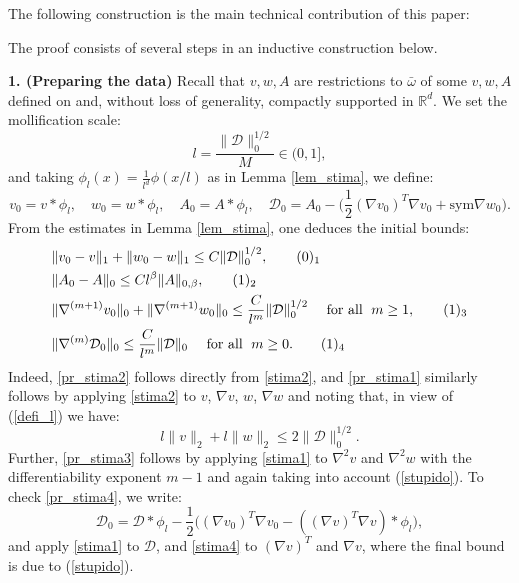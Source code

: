 \documentclass[reqno,twoside,11pt]{amsart}
\newcommand{\sym}{\mathrm{sym}}
\newcommand{\R}{\mathbb{R}}
\numberwithin{equation}{section}
\theoremstyle{plain}
\theoremstyle{definition}
\begin{document}
The following construction is the main technical contribution of this paper:

\medskip


The proof consists of several steps in an inductive construction below.

\smallskip

{\bf 1. (Preparing the data)} Recall that $v, w, A$ are restrictions
to $\bar\omega$ of some $v, w, A$ defined on and, without loss of
generality, compactly supported in $\R^d$. We set the mollification scale:
\begin{equation}\label{defi_l} 
l=\frac{\|\mathcal{D}\|_0^{1/2}}{M}\in (0, 1],
\end{equation}
and taking $\phi_l (x) = \frac{1}{l^d}\phi(x/l)$ as in Lemma \ref{lem_stima}, we define:
$$v_0=v\ast \phi_l,\quad w_0=w\ast \phi_l, \quad A_0=A\ast \phi_l,
\quad {\mathcal{D}}_0= A_0-\big(\frac{1}{2}(\nabla v_0)^T\nabla v_0 + \sym\nabla w_0\big).$$
From the estimates in Lemma \ref{lem_stima},  one deduces the initial bounds:
\begin{align*}
& \|v_0-v\|_1 + \|w_0-w\|_1 \leq C\|\mathcal{D}\|_{0}^{1/2},
\tag*{(\theequation)$_1$}\refstepcounter{equation} \label{pr_stima1}\\
& \|A_0-A\|_0 \leq Cl^\beta\|A\|_{0,\beta}, \tag*{(\theequation)$_2$} \label{pr_stima2}\\
& \|\nabla^{(m+1)}v_0\|_0 + \|\nabla^{(m+1)}w_0\|_0\leq
\frac{C}{l^m}\|\mathcal{D}\|_{0}^{1/2}\quad \mbox{ for all }\; m\geq
1, \tag*{(\theequation)$_3$} \label{pr_stima3}\\
& \|\nabla^{(m)} \mathcal{D}_0\|_0\leq
\frac{C}{l^m}\|\mathcal{D}\|_{0} \quad \mbox{ for all }\; m\geq 0. \tag*{(\theequation)$_4$}\label{pr_stima4}
\end{align*}
Indeed,  \ref{pr_stima2} follows directly from \ref{stima2}, and 
\ref{pr_stima1} similarly follows by applying \ref{stima2} to
$v$, $\nabla v$, $w$, $\nabla w$ and noting that,  in view of (\ref{defi_l}) we have:
\begin{equation}\label{stupido}
l\|v\|_2+ l\|w\|_2 \leq 2\|\mathcal{D}\|_0^{1/2}.
\end{equation}
Further, \ref{pr_stima3} follows by applying \ref{stima1} to
$\nabla^2v$ and $\nabla^2w$ with the differentiability exponent $m-1$ and
again taking into account (\ref{stupido}). To check \ref{pr_stima4}, we write:
$$\mathcal{D}_0 = \mathcal{D}\ast \phi_l -\frac{1}{2}\big((\nabla
v_0)^T\nabla v_0 - ((\nabla v)^T\nabla v)\ast\phi_l\big),$$ 
and apply \ref{stima1} to $\mathcal{D}$, and \ref{stima4} to $(\nabla
v)^T$ and $\nabla v$, where the final bound is due to (\ref{stupido}). 
\end{document}
